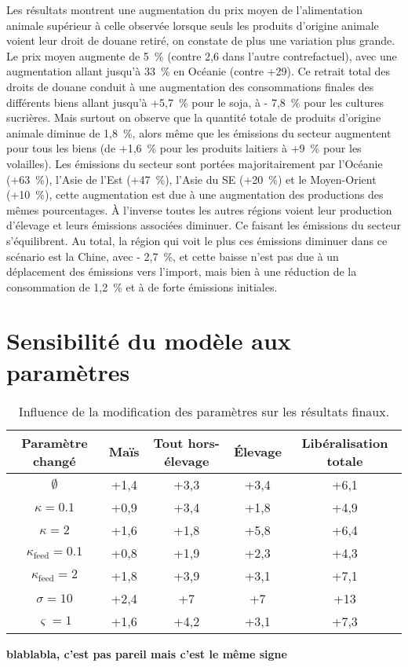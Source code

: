 Les résultats montrent une augmentation du prix moyen de l'alimentation animale supérieur à celle observée lorsque seuls les produits d'origine animale voient leur droit de douane retiré, on constate de plus une variation plus grande. Le prix moyen augmente de 5~\% (contre 2,6 dans l'autre contrefactuel), avec une augmentation allant jusqu'à 33~\% en Océanie (contre +29). Ce retrait total des droits de douane conduit à une augmentation des consommations finales des différents biens allant jusqu'à +5,7~\% pour le soja, à - 7,8~\% pour les cultures sucrières. Mais surtout on observe que la quantité totale de produits d'origine animale diminue de 1,8~\%, alors même que les émissions du secteur augmentent pour tous les biens (de +1,6~\% pour les produits laitiers à +9~\% pour les volailles). Les émissions du secteur sont portées majoritairement par l'Océanie (+63~\%), l'Asie de l'Est (+47~\%), l'Asie du SE (+20~\%) et le Moyen-Orient (+10~\%), cette augmentation est due à une augmentation des productions des mêmes pourcentages. À l'inverse toutes les autres régions voient leur production d'élevage et leurs émissions associées diminuer. Ce faisant les émissions du secteur s'équilibrent. Au total, la région qui voit le plus ces émissions diminuer dans ce scénario est la Chine, avec - 2,7~\%, et cette baisse n'est pas due à un déplacement des émissions vers l'import, mais bien à une réduction de la consommation de 1,2~\% et à de forte émissions initiales.


\section{Sensibilité du modèle aux paramètres}

\begin{table}[hbt!]
    \centering
    \caption{Influence de la modification des paramètres sur les résultats finaux.}
    \label{tab:sensibilite_param}
    \begin{tabular}{c|cccc}
        \hline
        Paramètre changé           & Maïs & Tout hors-élevage & Élevage & Libéralisation totale \\ \hline
        $\emptyset$                & +1,4 & +3,3              & +3,4    & +6,1                  \\
        $\kappa = 0.1$             & +0,9 & +3,4              & +1,8    & +4,9                  \\
        $\kappa = 2$               & +1,6 & +1,8              & +5,8    & +6,4                  \\
        $\kappa_\text{feed} = 0.1$ & +0,8 & +1,9              & +2,3    & +4,3                  \\
        $\kappa_\text{feed} = 2$   & +1,8 & +3,9              & +3,1    & +7,1                  \\
        $\sigma = 10$              & +2,4 & +7                & +7      & +13                   \\
        $\varsigma = 1$            & +1,6 & +4,2              & +3,1    & +7,3                  \\
        \hline
    \end{tabular}%
\end{table}

\textbf{blablabla, c'est pas pareil mais c'est le même signe}